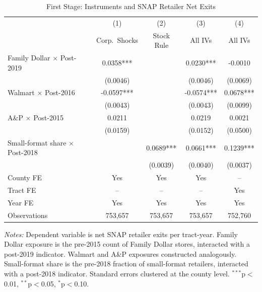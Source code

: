 \begin{table}[t]
\centering
\caption{First Stage: Instruments and SNAP Retailer Net Exits}
\label{tab:first_stage}
\begin{threeparttable}
\begin{tabular}{lcccc}
\toprule
& (1) & (2) & (3) & (4) \\
& Corp.\ Shocks & Stock Rule & All IVs & All IVs \\
\midrule
Family Dollar $\times$ Post-2019 & 0.0358*** &  & 0.0230*** & -0.0010 \\
& (0.0046) &  & (0.0046) & (0.0069) \\
Walmart $\times$ Post-2016 & -0.0597*** &  & -0.0574*** & 0.0678*** \\
& (0.0043) &  & (0.0043) & (0.0099) \\
A\&P $\times$ Post-2015 & 0.0211 &  & 0.0219 & 0.0021 \\
& (0.0159) &  & (0.0152) & (0.0500) \\
Small-format share $\times$ Post-2018 &  & 0.0689*** & 0.0661*** & 0.1239*** \\
&  & (0.0039) & (0.0040) & (0.0037) \\
\midrule
County FE & Yes & Yes & Yes & -- \\
Tract FE & -- & -- & -- & Yes \\
Year FE & Yes & Yes & Yes & Yes \\
\midrule
Observations & 753,657 & 753,657 & 753,657 & 752,760 \\
\bottomrule
\end{tabular}
\begin{tablenotes}
\small
\item \textit{Notes:} Dependent variable is net SNAP retailer exits per tract-year. Family Dollar exposure is the pre-2015 count of Family Dollar stores, interacted with a post-2019 indicator. Walmart and A\&P exposures constructed analogously. Small-format share is the pre-2018 fraction of small-format retailers, interacted with a post-2018 indicator. Standard errors clustered at the county level. $^{***}$p$<$0.01, $^{**}$p$<$0.05, $^{*}$p$<$0.10.
\end{tablenotes}
\end{threeparttable}
\end{table}
